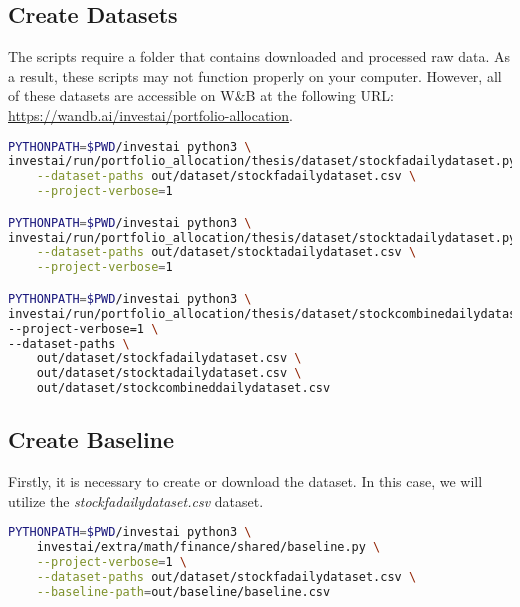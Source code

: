 \documentclass[../xlapes02]{subfiles}
\begin{document}
    \subsection{Create Datasets}
    The scripts require a folder that contains downloaded and processed raw data. As a result, these scripts may not function properly on your computer. However, all of these datasets are accessible on W\&B at the following URL: \url{https://wandb.ai/investai/portfolio-allocation}.
    \begin{lstlisting}[language=bash]
PYTHONPATH=$PWD/investai python3 \
investai/run/portfolio_allocation/thesis/dataset/stockfadailydataset.py \
    --dataset-paths out/dataset/stockfadailydataset.csv \
    --project-verbose=1

PYTHONPATH=$PWD/investai python3 \
investai/run/portfolio_allocation/thesis/dataset/stocktadailydataset.py \
    --dataset-paths out/dataset/stocktadailydataset.csv \
    --project-verbose=1

PYTHONPATH=$PWD/investai python3 \
investai/run/portfolio_allocation/thesis/dataset/stockcombinedailydataset.py \
--project-verbose=1 \
--dataset-paths \
    out/dataset/stockfadailydataset.csv \
    out/dataset/stocktadailydataset.csv \
    out/dataset/stockcombineddailydataset.csv
    \end{lstlisting}

    \subsection{Create Baseline}
    Firstly, it is necessary to create or download the dataset. In this case, we will utilize the \emph{stockfadailydataset.csv} dataset.
    \begin{lstlisting}[language=bash]
PYTHONPATH=$PWD/investai python3 \
    investai/extra/math/finance/shared/baseline.py \
    --project-verbose=1 \
    --dataset-paths out/dataset/stockfadailydataset.csv \
    --baseline-path=out/baseline/baseline.csv
    \end{lstlisting}
\end{document}
